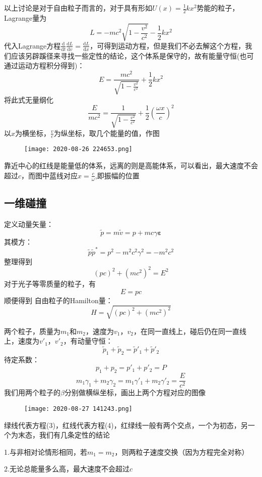 \documentclass[utf8]{ctexart}
\begin{document}
以上讨论是对于自由粒子而言的，对于具有形如$U(x)=\frac12 kx^2$势能的粒子，Lagrange量为\[L=-mc^2\sqrt{1-\frac{v^2}{c^2}}-\frac12 kx^2\]
代入Lagrange方程$\frac{\mathrm{d}}{\mathrm{d}t}\frac{\mathrm{d}L}{\mathrm{d}v}=\frac{\mathrm{d}L}{\mathrm{d}x}$，可得到运动方程，但是我们不必去解这个方程，我们应该另辟蹊径来寻找一些定性的结论，这个体系是保守的，故有能量守恒(也可通过运动方程积分得到)：
\[E=\frac{mc^2}{\sqrt{1-\frac{v^2}{c^2}}}+\frac12 kx^2\]
将此式无量纲化
\[\frac{E}{mc^2}=\frac{1}{\sqrt{1-\frac{v^2}{c^2}}}+ \frac12 (\frac{\omega x}{c})^2\]
以$x$为横坐标，$\frac{v}{c}$为纵坐标，取几个能量的值，作图
\begin{figure}[H]
    \centering
    \texttt{[image: 2020-08-26 224653.png]}
    \label{fig:my_label}
\end{figure}
靠近中心的红线是能量低的体系，远离的则是高能体系，可以看出，最大速度不会超过$c$，而图中蓝线对应$x=\frac{c}{\omega}$,即振幅的位置
\subsection{一维碰撞}
定义动量矢量：\[\tilde{p}=m\tilde{v}=p+mc\gamma{\boldsymbol{\varepsilon}}\]其模方：\[\tilde{p}\tilde{p}^*=p^2-m^2c^2\gamma^2=-m^2c^2\]
整理得到\[(pc)^2+(mc^2)^2=E^2\]
对于光子等零质量的粒子，有\[E=pc\]顺便得到
自由粒子的Hamilton量：\[H=\sqrt{(pc)^2+(mc^2)^2}\]

两个粒子，质量为$m_1$和$m_2$，速度为$v_1$，$v_2$，在同一直线上，碰后仍在同一直线上，速度为$v'_1$，$v'_2$，有动量守恒：
\begin{equation}
\tilde{p}_1+\tilde{p}_2=\tilde{p}'_1+\tilde{p}'_2
\end{equation}
待定系数：
\begin{equation}
    p_1+p_2=p'_1+p'_2=P
\end{equation}
\begin{equation}
m_1\gamma_1+m_2\gamma_2=m_1\gamma'_1+m_2\gamma'_2=\frac{E}{c^2}
\end{equation}
我们用两个粒子的$\beta$分别做横纵坐标，画出上两个方程对应的图像
\begin{figure}[H]
    \centering
    \texttt{[image: 2020-08-27 141243.png]}
    \label{fig:my_label}
\end{figure}
绿线代表方程(3)，红线代表方程(4)，红绿线一般有两个交点，一个为初态，另一个为末态，我们有几条定性的结论

1.与非相对论情形相同，若$m_1=m_2$，则两粒子速度交换（因为方程完全对称）

2.无论总能量多么高，最大速度不会超过$c$
\end{document}
